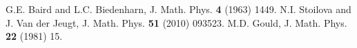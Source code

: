 \documentclass[12pt]{article}
\begin{document}
\begin{thebibliography}{10}
 G.E. Baird and L.C. Biedenharn, J. Math. Phys. {\bf 4} (1963) 1449.
%  
%  
% 
 N.I. Stoilova and J. Van der Jeugt, J. Math. Phys. {\bf 51} (2010) 093523.
% 
% 
% 
 M.D. Gould, J. Math. Phys. {\bf 22} (1981) 15.


\end{thebibliography}
\end{document}
